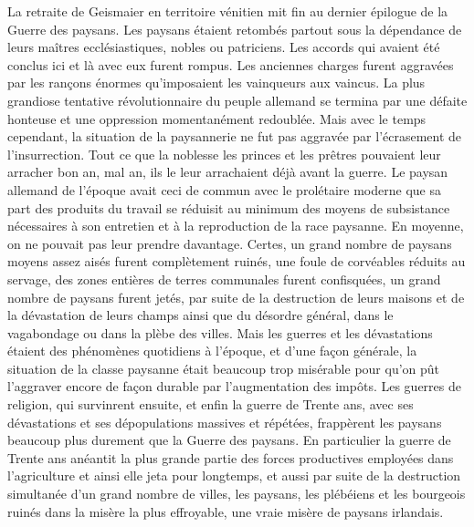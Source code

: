 \documentclass[french,twoside]{book} %
\newcommand\chaptercont{} %
\begin{document}
\chaptercont
\noindent La retraite de Geismaier en territoire vénitien mit fin au dernier épilogue de la Guerre des paysans. Les paysans étaient retombés partout sous la dépendance de leurs maîtres ecclésiastiques, nobles ou patriciens. Les accords qui avaient été conclus ici et là avec eux furent rompus. Les anciennes charges furent aggravées par les rançons énormes qu’imposaient les vainqueurs aux vaincus. La plus grandiose tentative révolutionnaire du peuple allemand se termina par une défaite honteuse et une oppression momentanément redoublée. Mais avec le temps cependant, la situation de la paysannerie ne fut pas aggravée par l’écrasement de l’insurrection. Tout ce que la noblesse les princes et les prêtres pouvaient leur arracher bon an, mal an, ils le leur arrachaient déjà avant la guerre. Le paysan allemand de l’époque avait ceci de commun avec le prolétaire moderne que sa part des produits du travail se réduisit au minimum des moyens de subsistance nécessaires à son entretien et à la reproduction de la race paysanne. En moyenne, on ne pouvait pas leur prendre davantage. Certes, un grand nombre de paysans moyens assez aisés furent complètement ruinés, une foule de corvéables réduits au servage, des zones entières de terres communales furent confisquées, un grand nombre de paysans furent jetés, par suite de la destruction de leurs maisons et de la dévastation de leurs champs ainsi que du désordre général, dans le vagabondage ou dans la plèbe des villes. Mais les guerres et les dévastations étaient des phénomènes quotidiens à l’époque, et d’une façon générale, la situation de la classe paysanne était beaucoup trop misérable pour qu’on pût l’aggraver encore de façon durable par l’augmentation des impôts. Les guerres de religion, qui survinrent ensuite, et enfin la guerre de Trente ans, avec ses dévastations et ses dépopulations massives et répétées, frappèrent les paysans beaucoup plus durement que la Guerre des paysans. En particulier la guerre de Trente ans anéantit la plus grande partie des forces productives employées dans l’agriculture et ainsi elle jeta pour longtemps, et aussi par suite de la destruction simultanée d’un grand nombre de villes, les paysans, les plébéiens et les bourgeois ruinés dans la misère la plus effroyable, une vraie misère de paysans irlandais.\par
\end{document}
